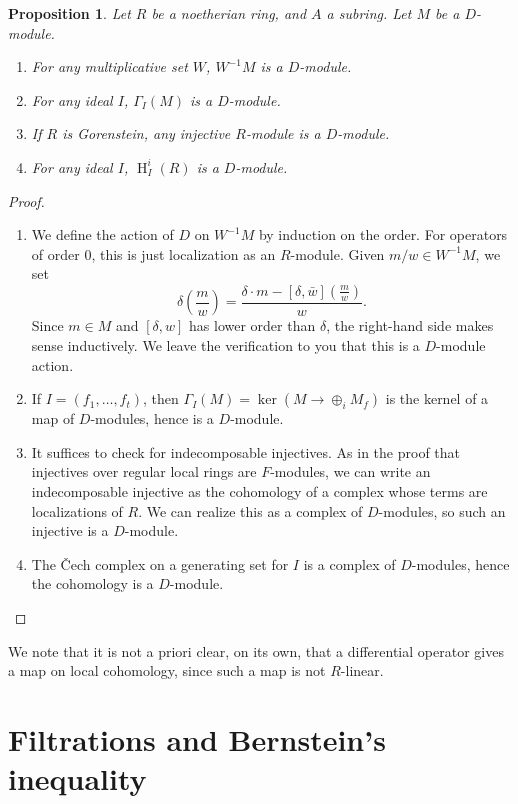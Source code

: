 \documentclass[11pt]{book}
\newtheorem{proposition}[theorem]{Proposition}
\numberwithin{equation}{section}
\numberwithin{theorem}{chapter}
\theoremstyle{definition}
\newtheorem*{basic properties}{Basic Properties}
\newtheorem*{Important Remark}{Important Remark}
\theoremstyle{remark}
\renewcommand{\ker}{\operatorname{ker}}
\renewcommand{\H}{\operatorname{H}}
\begin{document}
\begin{proposition}
	Let $R$ be a noetherian ring, and $A$ a subring. Let $M$ be a $D$-module.
	\begin{enumerate}
		\item For any multiplicative set $W$, $W^{-1} M$ is a $D$-module.
		\item For any ideal $I$, $\Gamma_I(M)$ is a $D$-module.
		\item If $R$ is Gorenstein, any injective $R$-module is a $D$-module.
		\item For any ideal $I$, $\H^i_I(R)$ is a $D$-module.
	\end{enumerate}
\end{proposition}
\begin{proof}
	\begin{enumerate}
		\item We define the action of $D$ on $W^{-1}M$ by induction on the order. For operators of order $0$, this is just localization as an $R$-module. Given $m/w\in W^{-1}M$, we set 
		\[ \delta \left( \frac{m}{w}\right)=\frac{\delta\cdot m - [\delta,\bar{w}](\frac{m}{w})}{w}.\]
		Since $m\in M$ and $[\delta,w]$ has lower order than $\delta$, the right-hand side makes sense inductively. We leave the verification to you that this is a $D$-module action.
		
		\item If $I=(f_1,\dots,f_t)$, then $\Gamma_I(M)=\ker(M\to \oplus_i M_f)$ is the kernel of a map of $D$-modules, hence is a $D$-module.
		
		\item It suffices to check for indecomposable injectives. As in the proof that injectives over regular local rings are $F$-modules, we can write an indecomposable injective as the cohomology of a complex whose terms are localizations of $R$. We can realize this as a complex of $D$-modules, so such an injective is a $D$-module.
		
		\item The \v Cech complex on a generating set for $I$ is a complex of $D$-modules, hence the cohomology is a $D$-module.\qedhere
	\end{enumerate}
\end{proof}

We note that it is not a priori clear, on its own, that a differential operator gives a map on local cohomology, since such a map is not $R$-linear.


\section{Filtrations and Bernstein's inequality}
\end{document}
